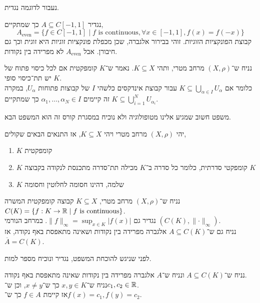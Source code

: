 נעבור לדוגמה נגדית.
\begin{example}
	נגדיר $A \subseteq C[-1, 1]$ כך שמתקיים,
	\[
		A_{\text{even}}
		= \{ f \in C[-1, 1] \mid f \text{ is continuous}, \forall x \in [-1, 1], f(x) = f(-x) \}
	\]
	קבוצת הפונקציות הזוגיות.
	זוהי בבירור אלגברה, שכן מכפלת פונקציות זוגיות היא זוגית וכך גם חיבורן.
	אבל $A_{\text{even}}$ לא מפרידה בין נקודות.
\end{example}
\begin{definition}
	נניח ש־$(X, \rho)$ מרחב מטרי, ותהי $K \subseteq X$.
	נאמר ש־$K$ קומפקטית אם לכל כיסוי פתוח של $K$ יש תת־כיסוי סופי. \\
	כלומר אם $K \subseteq \bigcup_{\alpha \in I} U_{\alpha}$ עבור קבוצת אינדקסים כלשהי $I$ של קבוצות פתוחות $U_{\alpha}$,
	במקרה זה קיימים $\alpha_1, \ldots, \alpha_N \in I$ כך שמתקיים $K \subseteq \bigcup_{i = 1}^N U_{\alpha_i}$.
\end{definition}
משפט חשוב שמגיע אלינו מטופולוגיה ולא נוכיח במסגרת קורס זה הוא המשפט הבא.
\begin{theorem}
	יהי $(X, \rho)$ מרחב מטרי ויהי $K \subseteq X$, אז התנאים הבאים שקולים,
	\begin{enumerate}
		\item $K$ קומפקטית
		\item $K$ קומפקטי סדרתית,
			כלומר כל סדרה ב־$K$ מכילה תת־סדרה מתכנסת לנקודה בקבוצה $K$
		\item $K$ שלמה, דהינו חסומה לחלוטין וחסומה
	\end{enumerate}
\end{theorem}
\begin{theorem}\label{stone_weistrass_theorem}
	נניח ש־$(X, \rho)$ מרחב מטרי,
	$K \subseteq X$ קבוצה קומפקטית המשרה $C(K) = \{ f : K \to \mathbb{R} \mid f \text{ is continuous} \}$. \\
	נגדיר גם $\lVert f \rVert_\infty = \sup_{x \in K} |f(x)|$.
	במרחב הנורמי $(C(K), \lVert \cdot \rVert_\infty)$. \\
	נניח גם ש־$A \subseteq C(K)$ אלגברה מפרידה בין נקודות ושאינה מתאפסת באף נקודה,
	אז $\overline{A} = C(K)$.
\end{theorem}
לפני שניגש להוכחת המשפט, נגדיר ונוכיח מספר למות.
\begin{lemma}
	נניח ש־$A \subseteq C(K)$ ונניח ש־$A$ אלגברה מפרידה בין נקודות שאינה מתאפסת באף נקודה. \\
	נניח ש־$x, y \in K$ כך ש־$x \ne y$, וכן ש־$c_1, c_2 \in \mathbb{R}$. \\
	אז קיימת $f \in A$ כך ש־$f(x) = c_1, f(y) = c_2$.
\end{lemma}
